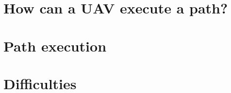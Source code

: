 \documentclass[12pt, a4paper]{report}
\begin{document}
    \section{How can a UAV execute a path?}

    \section{Path execution}
    
    \clearpage
    \section{Difficulties}
    

  \printbibliography[heading=none]

\end{document}
